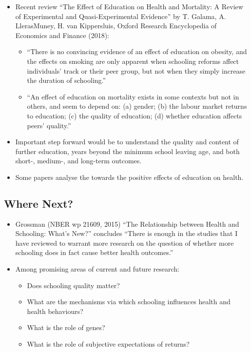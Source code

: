         \begin{itemize}
            \item Recent review “The Effect of Education on Health and Mortality: A Review of Experimental and Quasi-Experimental Evidence” by T. Galama, A. LlerasMuney, H. van Kippersluis, Oxford Research Encyclopedia of Economics and Finance (2018):
                \begin{itemize}
                    \item “There is no convincing evidence of an effect of education on obesity, and the effects on smoking are only apparent when schooling reforms affect individuals’ track or their peer group, but not when they simply increase the duration of schooling.”
                    \item “An effect of education on mortality exists in some contexts but not in others, and seem to depend on: (a) gender; (b) the labour market returns to education; (c) the quality of education; (d) whether education affects peers’ quality.”
                \end{itemize}
            \item Important step forward would be to understand the quality and content of further education, years beyond the minimum school leaving age, and both short-, medium-, and long-term outcomes.
            \item Some papers analyse the  towards the positive effects of education on health.
        \end{itemize}

    \subsection{Where Next?}

        \begin{itemize}
            \item Grossman (NBER wp 21609, 2015) “The Relationship between Health and Schooling: What’s New?” concludes “There is enough  in the studies that I have reviewed to warrant more research on the question of whether more schooling does in fact cause better health outcomes.”
            \item Among promising areas of current and future research:
            \begin{itemize}
            \item Does schooling quality matter?
            \item What are the mechanisms via which schooling influences health and health behaviours?
            \item What is the role of genes?
            \item What is the role of subjective expectations of returns?
            \end{itemize}
        \end{itemize}

